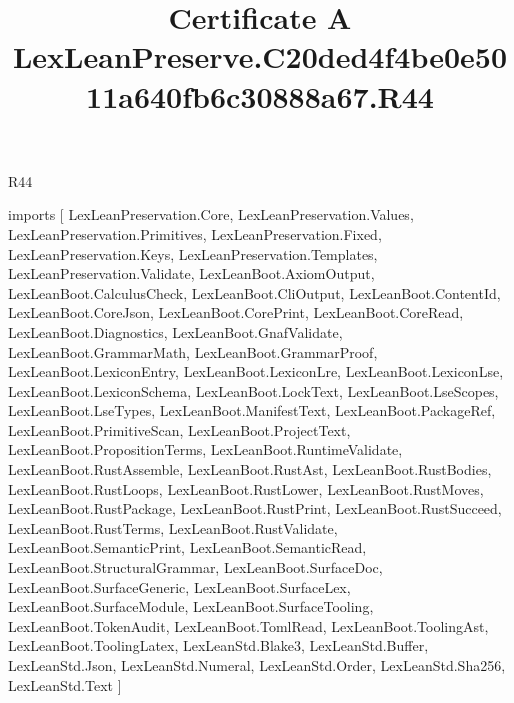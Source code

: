 \begin{lexlean}{R44}
\title{Certificate A LexLeanPreserve.C20ded4f4be0e5011a640fb6c30888a67.R44}
\begin{coremodule}
imports [
  LexLeanPreservation.Core,
  LexLeanPreservation.Values,
  LexLeanPreservation.Primitives,
  LexLeanPreservation.Fixed,
  LexLeanPreservation.Keys,
  LexLeanPreservation.Templates,
  LexLeanPreservation.Validate,
  LexLeanBoot.AxiomOutput,
  LexLeanBoot.CalculusCheck,
  LexLeanBoot.CliOutput,
  LexLeanBoot.ContentId,
  LexLeanBoot.CoreJson,
  LexLeanBoot.CorePrint,
  LexLeanBoot.CoreRead,
  LexLeanBoot.Diagnostics,
  LexLeanBoot.GnafValidate,
  LexLeanBoot.GrammarMath,
  LexLeanBoot.GrammarProof,
  LexLeanBoot.LexiconEntry,
  LexLeanBoot.LexiconLre,
  LexLeanBoot.LexiconLse,
  LexLeanBoot.LexiconSchema,
  LexLeanBoot.LockText,
  LexLeanBoot.LseScopes,
  LexLeanBoot.LseTypes,
  LexLeanBoot.ManifestText,
  LexLeanBoot.PackageRef,
  LexLeanBoot.PrimitiveScan,
  LexLeanBoot.ProjectText,
  LexLeanBoot.PropositionTerms,
  LexLeanBoot.RuntimeValidate,
  LexLeanBoot.RustAssemble,
  LexLeanBoot.RustAst,
  LexLeanBoot.RustBodies,
  LexLeanBoot.RustLoops,
  LexLeanBoot.RustLower,
  LexLeanBoot.RustMoves,
  LexLeanBoot.RustPackage,
  LexLeanBoot.RustPrint,
  LexLeanBoot.RustSucceed,
  LexLeanBoot.RustTerms,
  LexLeanBoot.RustValidate,
  LexLeanBoot.SemanticPrint,
  LexLeanBoot.SemanticRead,
  LexLeanBoot.StructuralGrammar,
  LexLeanBoot.SurfaceDoc,
  LexLeanBoot.SurfaceGeneric,
  LexLeanBoot.SurfaceLex,
  LexLeanBoot.SurfaceModule,
  LexLeanBoot.SurfaceTooling,
  LexLeanBoot.TokenAudit,
  LexLeanBoot.TomlRead,
  LexLeanBoot.ToolingAst,
  LexLeanBoot.ToolingLatex,
  LexLeanStd.Blake3,
  LexLeanStd.Buffer,
  LexLeanStd.Json,
  LexLeanStd.Numeral,
  LexLeanStd.Order,
  LexLeanStd.Sha256,
  LexLeanStd.Text
]


\end{coremodule}
\end{lexlean}
